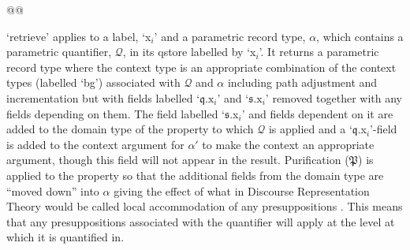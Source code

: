 @@


`$\mathrm{retrieve}$' applies to a label, `x$_i$' and a parametric
record type, $\alpha$, which contains a parametric quantifier,
$\mathcal{Q}$, in its qstore labelled by `x$_i$'.  It returns a
parametric record type where the context type is an appropriate
combination of the context types (labelled `bg') associated with
$\mathcal{Q}$ and $\alpha$ including path adjustment and
incrementation but with fields labelled `$\mathfrak{q}.\text{x}_i$'
and `$\mathfrak{s}.\text{x}_i$' removed together with any fields
depending on them.  The field labelled `$\mathfrak{s}$.x$_i$' and
fields dependent on it are added to the
domain type of the property to which $\mathcal{Q}$ is applied  and a
`$\mathfrak{q}$.x$_i$'-field is added to the context argument for
$\alpha'$ to make the context an appropriate argument,
though this field will not appear in the result.  
Purification ($\mathfrak{P}$) is applied to the property so that the
additional fields from the domain type are ``moved down'' into $\alpha$ giving the effect
of what in Discourse Representation Theory would be called local
accommodation of any presuppositions \citep{VanderSandt1992}.  This
means that any presuppositions associated with the quantifier will
apply at the level at which it is quantified in.

